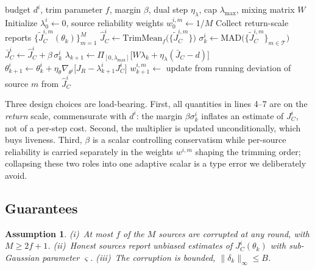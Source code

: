 \documentclass{article}
\newtheorem{assumption}{Assumption}
\begin{document}
\begin{algorithm}[t]
\caption{Robust Constraint Estimation (RCE) for agent $i$}
\label{alg:rce}
\begin{algorithmic}[1]
\REQUIRE budget $d^i$, trim parameter $f$, margin $\beta$, dual step $\eta_\lambda$, cap $\lambda_{\max}$, mixing matrix $W$
\STATE Initialize $\lambda^i_0 \gets 0$, source reliability weights $w^{i,m}_0 \gets 1/M$
  \STATE Collect return-scale reports $\{\tilde{J}^{i,m}_C(\theta_k)\}_{m=1}^{M}$
  \STATE $\hat{J}^i_C \gets \mathrm{TrimMean}_f\big(\{\tilde{J}^{i,m}_C\}\big)$ \hfill {}
  \STATE $\sigma^i_k \gets \mathrm{MAD}\big(\{\tilde{J}^{i,m}_C\}_{m\in\mathcal{T}}\big)$ \hfill {}
  \STATE $\bar{J}^i_C \gets \hat{J}^i_C + \beta\,\sigma^i_k$ \hfill {}
  \STATE $\lambda_{k+1} \gets \Pi_{[0,\lambda_{\max}]}\big[W\lambda_k + \eta_\lambda(\bar{J}_C - d)\big]$ \hfill {}
  \STATE $\theta^i_{k+1} \gets \theta^i_k + \eta_\theta\nabla_{\theta^i}\big[J_R - \lambda^i_{k+1} J^i_C\big]$
  \STATE $w^{i,m}_{k+1} \gets$ update from running deviation of source $m$ from $\hat{J}^i_C$
\ENDFOR
\end{algorithmic}
\end{algorithm}

Three design choices are load-bearing. First, all quantities in lines 4--7 are on the \emph{return} scale, commensurate with $d^i$: the margin $\beta\sigma^i_k$ inflates an estimate of $J^i_C$, not of a per-step cost. Second, the multiplier is updated unconditionally, which buys liveness. Third, $\beta$ is a scalar controlling conservatism while per-source reliability is carried separately in the weights $w^{i,m}$ shaping the trimming order; collapsing these two roles into one adaptive scalar is a type error we deliberately avoid.

\subsection{Guarantees}

\begin{assumption}
\label{ass:main}
(i)~At most $f$ of the $M$ sources are corrupted at any round, with $M \ge 2f+1$. (ii)~Honest sources report unbiased estimates of $J^i_C(\theta_k)$ with sub-Gaussian parameter $\varsigma$. (iii)~The corruption is bounded, $\|\delta_k\|_\infty \le B$.
\end{assumption}
\end{document}
